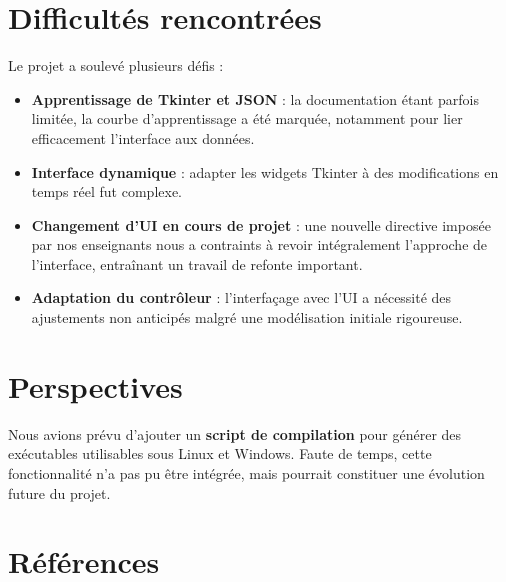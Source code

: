 \documentclass[a4paper,12pt]{article}
\begin{document}
\section{Difficultés rencontrées}

Le projet a soulevé plusieurs défis :
\begin{itemize}
    \item \textbf{Apprentissage de Tkinter et JSON} : la documentation étant parfois limitée, la courbe d’apprentissage a été marquée, notamment pour lier efficacement l’interface aux données.
    \item \textbf{Interface dynamique} : adapter les widgets Tkinter à des modifications en temps réel fut complexe.
    \item \textbf{Changement d’UI en cours de projet} : une nouvelle directive imposée par nos enseignants nous a contraints à revoir intégralement l’approche de l’interface, entraînant un travail de refonte important.
    \item \textbf{Adaptation du contrôleur} : l'interfaçage avec l’UI a nécessité des ajustements non anticipés malgré une modélisation initiale rigoureuse.
\end{itemize}

\section{Perspectives}

Nous avions prévu d'ajouter un \textbf{script de compilation} pour générer des exécutables utilisables sous Linux et Windows. Faute de temps, cette fonctionnalité n’a pas pu être intégrée, mais pourrait constituer une évolution future du projet.

\newpage
\section*{Références}
\nocite{*}
\printbibliography
\end{document}
